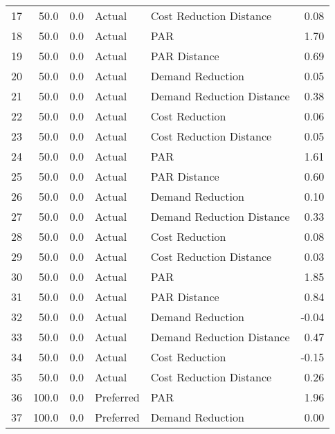 \begin{longtable}{lrrllr}
17   &         50.0 &     0.0 &         Actual &    Cost Reduction Distance &   0.08 \\
18   &         50.0 &     0.0 &         Actual &                        PAR &   1.70 \\
19   &         50.0 &     0.0 &         Actual &               PAR Distance &   0.69 \\
20   &         50.0 &     0.0 &         Actual &           Demand Reduction &   0.05 \\
21   &         50.0 &     0.0 &         Actual &  Demand Reduction Distance &   0.38 \\
22   &         50.0 &     0.0 &         Actual &             Cost Reduction &   0.06 \\
23   &         50.0 &     0.0 &         Actual &    Cost Reduction Distance &   0.05 \\
24   &         50.0 &     0.0 &         Actual &                        PAR &   1.61 \\
25   &         50.0 &     0.0 &         Actual &               PAR Distance &   0.60 \\
26   &         50.0 &     0.0 &         Actual &           Demand Reduction &   0.10 \\
27   &         50.0 &     0.0 &         Actual &  Demand Reduction Distance &   0.33 \\
28   &         50.0 &     0.0 &         Actual &             Cost Reduction &   0.08 \\
29   &         50.0 &     0.0 &         Actual &    Cost Reduction Distance &   0.03 \\
30   &         50.0 &     0.0 &         Actual &                        PAR &   1.85 \\
31   &         50.0 &     0.0 &         Actual &               PAR Distance &   0.84 \\
32   &         50.0 &     0.0 &         Actual &           Demand Reduction &  -0.04 \\
33   &         50.0 &     0.0 &         Actual &  Demand Reduction Distance &   0.47 \\
34   &         50.0 &     0.0 &         Actual &             Cost Reduction &  -0.15 \\
35   &         50.0 &     0.0 &         Actual &    Cost Reduction Distance &   0.26 \\
36   &        100.0 &     0.0 &      Preferred &                        PAR &   1.96 \\
37   &        100.0 &     0.0 &      Preferred &           Demand Reduction &   0.00 \\

\end{longtable}
